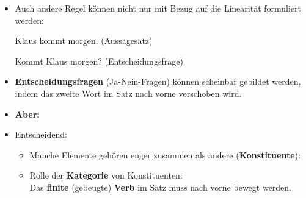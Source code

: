 \begin{frame}

\begin{itemize}
	\item Auch andere Regel können nicht nur mit Bezug auf die Linearität formuliert werden:
	
	\ea Klaus kommt morgen. \hfill (Aussagesatz)
	\z

	\ea Kommt Klaus morgen? \hfill (Entscheidungsfrage)
	\z
	
	\item \textbf{Entscheidungsfragen} (Ja-Nein-Fragen) können scheinbar gebildet werden, indem das zweite Wort im Satz nach vorne verschoben wird.\\

\pause
	
	\item[] \textbf{Aber:}
	
	\z
	
	\z
	
\end{itemize}

\end{frame}


\begin{frame}

\begin{itemize}

	\item Entscheidend:
		\begin{itemize}
			\item Manche Elemente gehören enger zusammen als andere (\ras \textbf{Konstituente}): 

			\z
			
			\item Rolle der \textbf{Kategorie} von Konstituenten:\\
			\ras Das \textbf{finite} (gebeugte) \textbf{Verb} im Satz muss nach vorne bewegt werden.
			
			\z
			
		\end{itemize}

\end{itemize}

\end{frame}


